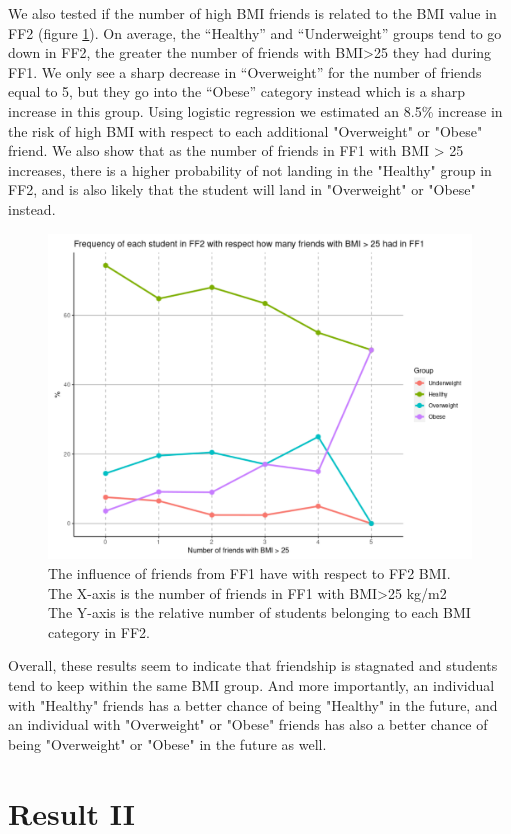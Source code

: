 We also tested if the number of high BMI friends is related to the BMI value in FF2 (figure \ref{figure:Results1evolutionBMI}). On average, the “Healthy” and “Underweight” groups tend to go down in FF2, the greater the number of friends with BMI>25 they had during FF1. We only see a sharp decrease in “Overweight” for the number of friends equal to 5, but they go into the “Obese” category instead which is a sharp increase in this group. Using logistic regression we estimated an 8.5\% increase in the risk of high BMI with respect to each additional "Overweight" or "Obese" friend. We also show that as the number of friends in FF1 with BMI > 25 increases, there is a higher probability of not landing in the "Healthy" group in FF2, and is also likely that the student will land in "Overweight" or "Obese" instead.

    \begin{figure}[ht]
        \centering
            \includegraphics[width=0.75\linewidth]{figures/Results/ResultOne/bmiInfluence.png } 
        \caption{ The influence of friends from FF1 have with respect to FF2 BMI. The X-axis is the number of friends in FF1 with BMI>25 kg/m2 The Y-axis is the relative number of students belonging to each BMI category in FF2.}
        \label{figure:Results1evolutionBMI}
    \end{figure}

Overall, these results seem to indicate that friendship is stagnated and students tend to keep within the same BMI group. And more importantly, an individual with "Healthy" friends has a better chance of being "Healthy" in the future, and an individual with "Overweight" or "Obese" friends has also a better chance of being "Overweight" or "Obese" in the future as well.


\section{Result II}

